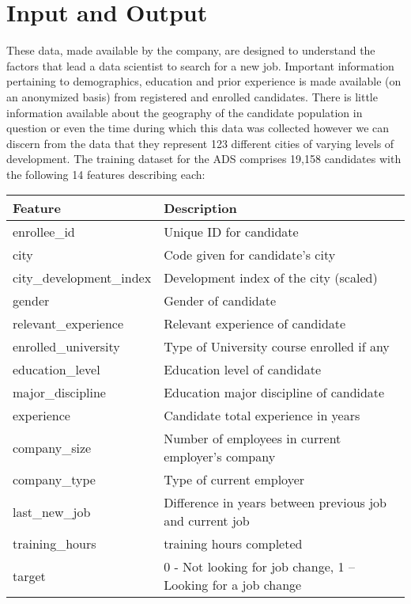\documentclass[11pt]{article}
\begin{document}
\section{Input and Output}

These data, made available by the company, are designed to understand the factors that lead a data scientist to search for a new job.  Important information pertaining to demographics, education and prior experience is made available (on an anonymized basis) from registered and enrolled candidates.  There is little information available about the geography of the candidate population in question or even the time during which this data was collected however we can discern from the data that they represent 123 different cities of varying levels of development.  The training dataset for the ADS comprises 19,158 candidates with the following 14 features describing each:



\begin{table}[h]
\centering
\begin{tabular}{ |p{4cm}||p{10cm}|  }
 
 \hline
 Feature 		& Description		\\
 \hline
enrollee\_id 	& Unique ID for candidate\\
city			& Code given for candidate's city \\
city\_development\_index & Development index of the city (scaled)\\
gender		& Gender of candidate\\
relevant\_experience & Relevant experience of candidate\\
enrolled\_university & Type of University course enrolled if any \\

education\_level & Education level of candidate\\

major\_discipline & Education major discipline of candidate \\

experience 	& Candidate total experience in years\\

company\_size 	& Number of employees in current employer's company \\

company\_type 	& Type of current employer\\

last\_new\_job 	& Difference in years between previous job and current job \\

training\_hours 	& training hours completed \\

target 		& 0 - Not looking for job change, 1 – Looking for a job change\\
 \hline
\end{tabular}
\end{table}
\end{document}

